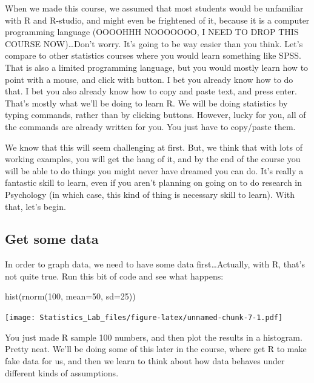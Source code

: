 \documentclass[
]{book}
\newenvironment{Shaded}{\begin{snugshade}}{\end{snugshade}}
\newcommand{\AttributeTok}[1]{\textcolor[rgb]{0.77,0.63,0.00}{#1}}
\newcommand{\DecValTok}[1]{\textcolor[rgb]{0.00,0.00,0.81}{#1}}
\newcommand{\FunctionTok}[1]{\textcolor[rgb]{0.00,0.00,0.00}{#1}}
\newcommand{\NormalTok}[1]{#1}
\begin{document}
When we made this course, we assumed that most students would be unfamiliar with R and R-studio, and might even be frightened of it, because it is a computer programming language (OOOOHHH NOOOOOOO, I NEED TO DROP THIS COURSE NOW)\ldots Don't worry. It's going to be way easier than you think. Let's compare to other statistics courses where you would learn something like SPSS. That is also a limited programming language, but you would mostly learn how to point with a mouse, and click with button. I bet you already know how to do that. I bet you also already know how to copy and paste text, and press enter. That's mostly what we'll be doing to learn R. We will be doing statistics by typing commands, rather than by clicking buttons. However, lucky for you, all of the commands are already written for you. You just have to copy/paste them.

We know that this will seem challenging at first. But, we think that with lots of working examples, you will get the hang of it, and by the end of the course you will be able to do things you might never have dreamed you can do. It's really a fantastic skill to learn, even if you aren't planning on going on to do research in Psychology (in which case, this kind of thing is necessary skill to learn). With that, let's begin.

\hypertarget{get-some-data}{%
\subsection{Get some data}\label{get-some-data}}

In order to graph data, we need to have some data first\ldots Actually, with R, that's not quite true. Run this bit of code and see what happens:

\begin{Shaded}
\begin{Highlighting}[]
\FunctionTok{hist}\NormalTok{(}\FunctionTok{rnorm}\NormalTok{(}\DecValTok{100}\NormalTok{, }\AttributeTok{mean=}\DecValTok{50}\NormalTok{, }\AttributeTok{sd=}\DecValTok{25}\NormalTok{))}
\end{Highlighting}
\end{Shaded}

\texttt{[image: Statistics\_Lab\_files/figure-latex/unnamed-chunk-7-1.pdf]}

You just made R sample 100 numbers, and then plot the results in a histogram. Pretty neat. We'll be doing some of this later in the course, where get R to make fake data for us, and then we learn to think about how data behaves under different kinds of assumptions.
\end{document}
